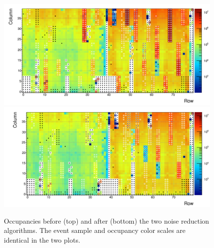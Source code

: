 \begin{figure}[htbp]\centering
  \includegraphics[width=12cm]{fig_rtpc/Occ2d_norej2.png}
  \includegraphics[width=12cm,trim={2.5cm 0 0 0},clip]{fig_rtpc/Occ2d_rej.png}
  \caption{Occupancies before (top) and after (bottom) the two noise reduction algorithms.  The event sample and occupancy color scales are identical in the two plots.\label{fig:occ_noiserej}}
\end{figure}


\clearpage
